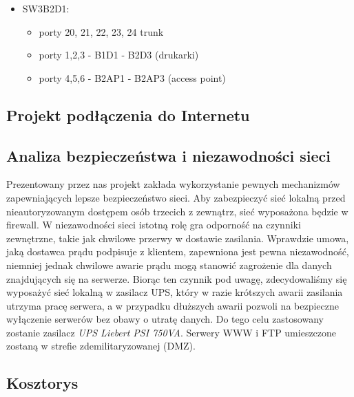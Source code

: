 \documentclass[a4paper, 12pt]{article}
\begin{document}
\begin{itemize}
\item SW3B2D1:
	\begin{itemize}
	\item porty 20, 21, 22, 23, 24 trunk
	\item porty 1,2,3 - B1D1 - B2D3 (drukarki)
	\item porty 4,5,6 - B2AP1 - B2AP3 (access point)
	\end{itemize}
	
\end{itemize}

\subsection{Projekt podłączenia do Internetu}

\subsection{Analiza bezpieczeństwa i niezawodności sieci}
Prezentowany przez nas projekt zakłada wykorzystanie pewnych mechanizmów zapewniających lepsze bezpieczeństwo sieci. Aby zabezpieczyć sieć lokalną przed nieautoryzowanym dostępem osób trzecich z zewnątrz, sieć wyposażona będzie w firewall. W niezawodności sieci istotną rolę gra odporność na czynniki zewnętrzne, takie jak chwilowe przerwy w dostawie zasilania. Wprawdzie umowa, jaką dostawca prądu podpisuje z klientem, zapewniona jest pewna niezawodność, niemniej jednak chwilowe awarie prądu mogą stanowić zagrożenie dla danych znajdujących się na serwerze. Biorąc ten czynnik pod uwagę, zdecydowaliśmy się wyposażyć sieć lokalną w zasilacz UPS, który w razie krótszych awarii zasilania utrzyma pracę serwera, a w przypadku dłuższych awarii pozwoli na bezpieczne wyłączenie serwerów bez obawy o utratę danych. Do tego celu zastosowany zostanie zasilacz \textit{UPS Liebert PSI 750VA}.%
Serwery WWW i FTP umieszczone zostaną w strefie zdemilitaryzowanej (DMZ).

\subsection{Kosztorys}
\end{document}
